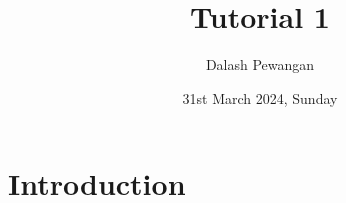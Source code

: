 \documentclass{article}
\title{Tutorial 1}
\author{Dalash Pewangan}
\date{31st March 2024, Sunday}
\begin{document}
\maketitle

\section{Introduction}
\end{document}
